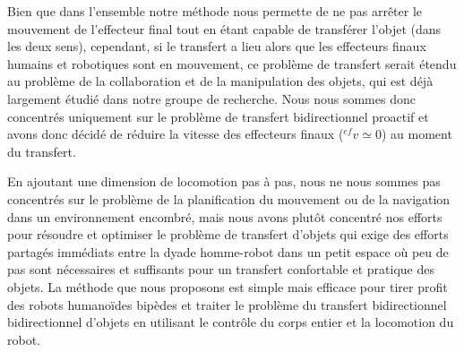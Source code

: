 Bien que dans l'ensemble notre méthode nous permette de ne pas arrêter le mouvement de l'effecteur final tout en étant capable de transférer l'objet (dans les deux sens), cependant, si le transfert a lieu alors que les effecteurs finaux humains et robotiques sont en mouvement, ce problème de transfert serait étendu au problème de la collaboration et de la manipulation des objets, qui est déjà largement étudié dans notre groupe de recherche. Nous nous sommes donc concentrés uniquement sur le problème de transfert bidirectionnel proactif et avons donc décidé de réduire la vitesse des effecteurs finaux (${}^{ef}v\simeq0$)  au moment du transfert. 



En ajoutant une dimension de locomotion pas à pas, nous ne nous sommes pas concentrés sur le problème de la planification du mouvement ou de la navigation dans un environnement encombré, mais nous avons plutôt concentré nos efforts pour résoudre et optimiser le problème de transfert d'objets qui exige des efforts partagés immédiats entre la dyade homme-robot dans un petit espace où peu de pas sont nécessaires et suffisants pour un transfert confortable et pratique des objets. La méthode que nous proposons est simple mais efficace pour tirer profit des robots humanoïdes bipèdes et traiter le problème du transfert bidirectionnel bidirectionnel d'objets en utilisant le contrôle du corps entier et la locomotion du robot.


\clearpage %
